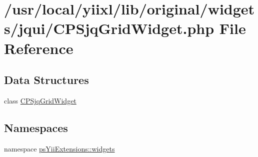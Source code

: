 \hypertarget{CPSjqGridWidget_8php}{
\section{/usr/local/yiixl/lib/original/widgets/jqui/CPSjqGridWidget.php File Reference}
\label{CPSjqGridWidget_8php}
}
\subsection*{Data Structures}
\begin{DoxyCompactItemize}
\item 
class \hyperlink{classCPSjqGridWidget}{CPSjqGridWidget}
\end{DoxyCompactItemize}
\subsection*{Namespaces}
\begin{DoxyCompactItemize}
\item 
namespace \hyperlink{namespacepsYiiExtensions_1_1widgets}{psYiiExtensions::widgets}
\end{DoxyCompactItemize}
